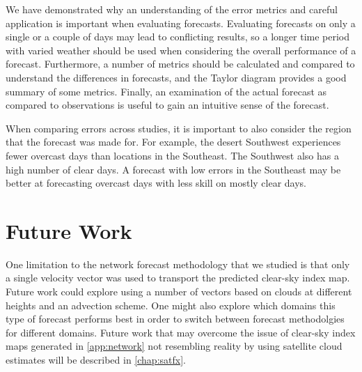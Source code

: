 We have demonstrated why an understanding of the error metrics and
careful application is important when evaluating forecasts.
Evaluating forecasts on only a single or a couple of days may lead to
conflicting results, so a longer time period with varied weather
should be used when considering the overall performance of a forecast.
Furthermore, a number of metrics should be calculated and compared to
 understand the differences in forecasts, and the Taylor diagram
provides a good summary of some metrics.
Finally, an examination of the actual forecast as compared to
observations is useful to gain an intuitive sense of the forecast.

When comparing errors across studies, it is important to also consider
the region that the forecast was made for.
For example, the desert Southwest experiences fewer overcast days than
locations in the Southeast.
The Southwest also has a high number of clear days.
A forecast with low errors in the Southeast may be better at
forecasting overcast days with less skill on mostly clear days.

\section{Future Work}
One limitation to the network forecast methodology that we studied is
that only a single velocity vector was used to transport the predicted
clear-sky index map.
Future work could explore using a number of vectors based on clouds at
different heights and an advection scheme.
One might also explore which domains this type of forecast performs
best in order to switch between forecast methodolgies for different
domains.
Future work that may overcome the issue of clear-sky index maps
generated in \cref{app:network} not resembling reality by using
satellite cloud estimates will be described in \cref{chap:satfx}.


